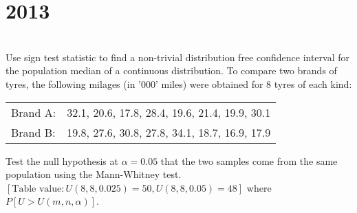\section*{2013}
\vspace{-.5cm}
\hrulefill \smallskip\\
 Use sign test statistic to find a non-trivial distribution free confidence interval for the population median of a continuous distribution.
\myline
{} To compare two brands of tyres, the following milages (in '000' miles) were obtained for 8 tyres of each kind:
\begin{center}
    \begin{tabular}{ll}
         Brand A: & 32.1, 20.6, 17.8, 28.4, 19.6, 21.4, 19.9, 30.1  \\
         Brand B: & 19.8, 27.6, 30.8, 27.8, 34.1, 18.7, 16.9, 17.9
    \end{tabular}
\end{center} Test the null hypothesis at $\alpha = 0.05$ that the two samples come from the same population using the Mann-Whitney test.\\ 
$\left[\text{Table value}: U(8,8,0.025) = 50, U(8,8,0.05) = 48\right]$ where $P\left[U > U(m,n,\alpha)\right]$.